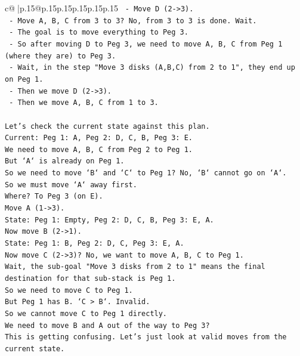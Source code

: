 \documentclass{article}
\begin{document}
{\begin{supertabular}{c@{$\;$}|p{.15\linewidth}@{}p{.15\linewidth}p{.15\linewidth}p{.15\linewidth}p{.15\linewidth}p{.15\linewidth}}
{{{\texttt{   {-} Move D (2{-}>3).} \\
\texttt{   {-} Move A, B, C from 3 to 3? No, from 3 to 3 is done. Wait.} \\
\texttt{   {-} The goal is to move everything to Peg 3.} \\
\texttt{   {-} So after moving D to Peg 3, we need to move A, B, C from Peg 1 (where they are) to Peg 3.} \\
\texttt{   {-} Wait, in the step "Move 3 disks (A,B,C) from 2 to 1", they end up on Peg 1.} \\
\texttt{   {-} Then we move D (2{-}>3).} \\
\texttt{   {-} Then we move A, B, C from 1 to 3.} \\
\\ 
\texttt{Let's check the current state against this plan.} \\
\texttt{Current: Peg 1: A, Peg 2: D, C, B, Peg 3: E.} \\
\texttt{We need to move A, B, C from Peg 2 to Peg 1.} \\
\texttt{But `A` is already on Peg 1.} \\
\texttt{So we need to move `B` and `C` to Peg 1? No, `B` cannot go on `A`.} \\
\texttt{So we must move `A` away first.} \\
\texttt{Where? To Peg 3 (on E).} \\
\texttt{Move A (1{-}>3).} \\
\texttt{State: Peg 1: Empty, Peg 2: D, C, B, Peg 3: E, A.} \\
\texttt{Now move B (2{-}>1).} \\
\texttt{State: Peg 1: B, Peg 2: D, C, Peg 3: E, A.} \\
\texttt{Now move C (2{-}>3)? No, we want to move A, B, C to Peg 1.} \\
\texttt{Wait, the sub{-}goal "Move 3 disks from 2 to 1" means the final destination for that sub{-}stack is Peg 1.} \\
\texttt{So we need to move C to Peg 1.} \\
\texttt{But Peg 1 has B. `C > B`. Invalid.} \\
\texttt{So we cannot move C to Peg 1 directly.} \\
\texttt{We need to move B and A out of the way to Peg 3?} \\
\texttt{This is getting confusing. Let's just look at valid moves from the current state.} \\
\\ 
}}}
\end{supertabular}}
\end{document}
